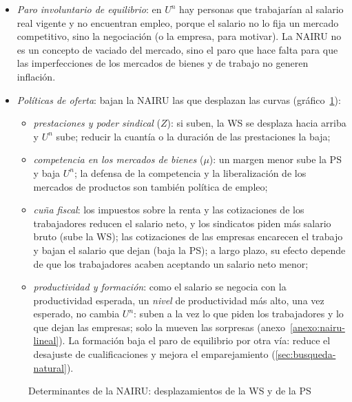 \documentclass[11pt]{article}
\begin{document}
\begin{itemize}
\item \emph{Paro involuntario de equilibrio}: en $U^n$ hay personas que trabajarían al salario real vigente y no encuentran empleo, porque el salario no lo fija un mercado competitivo, sino la negociación (o la empresa, para motivar). La NAIRU no es un concepto de vaciado del mercado, sino el paro que hace falta para que las imperfecciones de los mercados de bienes y de trabajo no generen inflación.
\item \emph{Políticas de oferta}: bajan la NAIRU las que desplazan las curvas (gráfico~\ref{fig:ws-ps-desplazamientos}):
  \begin{itemize}
  \item \emph{prestaciones y poder sindical} ($Z$): si suben, la WS se desplaza hacia arriba y $U^n$ sube; reducir la cuantía o la duración de las prestaciones la baja;
  \item \emph{competencia en los mercados de bienes} ($\mu$): un margen menor sube la PS y baja $U^n$; la defensa de la competencia y la liberalización de los mercados de productos son también política de empleo;
  \item \emph{cuña fiscal}: los impuestos sobre la renta y las cotizaciones de los trabajadores reducen el salario neto, y los sindicatos piden más salario bruto (sube la WS); las cotizaciones de las empresas encarecen el trabajo y bajan el salario que dejan (baja la PS); a largo plazo, su efecto depende de que los trabajadores acaben aceptando un salario neto menor;
  \item \emph{productividad y formación}: como el salario se negocia con la productividad esperada, un \emph{nivel} de productividad más alto, una vez esperado, no cambia $U^n$: suben a la vez lo que piden los trabajadores y lo que dejan las empresas; solo la mueven las sorpresas (anexo~\ref{anexo:nairu-lineal}). La formación baja el paro de equilibrio por otra vía: reduce el desajuste de cualificaciones y mejora el emparejamiento (\ref{sec:busqueda-natural}).
  \end{itemize}
\end{itemize}

\begin{figure}[H]
\centering
\caption{Determinantes de la NAIRU: desplazamientos de la WS y de la PS}\label{fig:ws-ps-desplazamientos}
\end{figure}
\end{document}
